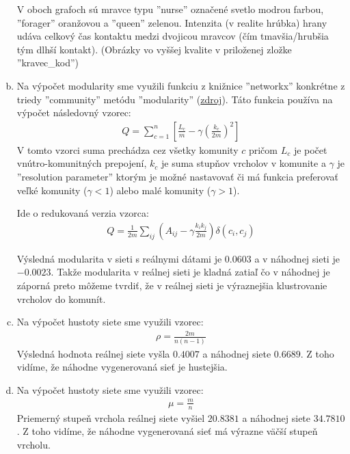 \documentclass[a4paper]{article}
\begin{document}
\begin{enumerate}[(a)]
	V oboch grafoch sú mravce typu ''nurse'' označené svetlo modrou farbou, ''forager'' oranžovou a ''queen'' zelenou. Intenzita (v realite hrúbka) hrany udáva celkový čas kontaktu medzi dvojicou mravcov (čím tmavšia/hrubšia tým dlhší kontakt). (Obrázky vo vyššej kvalite v priloženej zložke ''kravec\_kod'') 
	
	\item 
	Na výpočet modularity sme využili funkciu z knižnice ''networkx'' konkrétne z triedy ''community'' metódu ''modularity'' (\href{https://networkx.org/documentation/stable/reference/algorithms/generated/networkx.algorithms.community.quality.modularity.html}{zdroj}). Táto funkcia používa na výpočet následovný vzorec: 
	\begin{gather*}
		Q = \sum_{c=1}^{n} \left[ \frac{L_c}{m} - \gamma \left( \frac{k_c}{2m} \right)^2 \right]
	\end{gather*}
	V tomto vzorci suma prechádza cez všetky komunity $c$ pričom $L_c$ je počet vnútro-komunitných prepojení, $k_c$ je suma stupňov vrcholov v komunite a $\gamma$ je ''resolution parameter'' ktorým je možné nastavovať či má funkcia preferovať veľké komunity ($\gamma<1$) alebo malé komunity ($\gamma>1$).

	Ide o redukovaná verzia vzorca:
	\begin{gather*}
		Q = \frac{1}{2m} \sum_{ij} \left( A_{ij} - \gamma \frac{k_{i}k_{j}}{2m} \right) \delta (c_i, c_j)
	\end{gather*}

	Výsledná modularita v sieti s reálnymi dátami je $0.0603$ a v náhodnej sieti je $-0.0023$. Takže modularita v reálnej sieti je kladná zatiaľ čo v náhodnej je záporná preto môžeme tvrdiť, že v reálnej sieti je výraznejšia klustrovanie vrcholov do komunít.
	
	\item 
	Na výpočet hustoty siete sme využili vzorec: 
	\begin{gather*}
		\rho = \frac{2m}{n(n-1)}
	\end{gather*}
	Výsledná hodnota reálnej siete vyšla $0.4007$ a náhodnej siete $0.6689$. Z toho vidíme, že náhodne vygenerovaná sieť je hustejšia.
	
	\item 
	Na výpočet hustoty siete sme využili vzorec: 
	\begin{gather*}
		\mu = \frac{m}{n}
	\end{gather*}
	Priemerný stupeň vrchola reálnej siete vyšiel $20.8381$ a náhodnej siete $34.7810$. Z toho vidíme, že náhodne vygenerovaná sieť má výrazne väčší stupeň vrcholu.
	

\end{enumerate}
\end{document}
